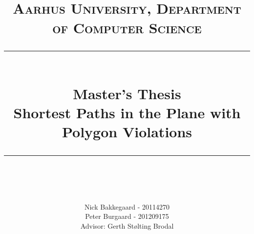 


\newcommand{\gerth}[1]{\todo[color=black!40]{#1}}
\newcommand{\nick}[1]{\todo[color=green!40]{#1}}
\newcommand{\peter}[1]{\todo[color=blue!40]{#1}}


\newcommand{\horrule}[1]{\rule{\linewidth}{#1}} %


\posttitle{
	\end{center}
}
\title{
	\\
	\normalfont \normalsize 
    \vspace{2cm}
	\textsc{Aarhus University, Department of Computer Science} \\ [25pt] %
	\horrule{0.5pt} \\[0.4cm] %
    \huge Master's Thesis \\
    \huge Shortest Paths in the Plane with Polygon Violations 
	\horrule{2pt} \\[0.5cm] %
}

\author{
	Nick Bakkegaard - 20114270\\
	Peter Burgaard - 201209175\\
	{\small Advisor: Gerth Stølting Brodal}
} %

